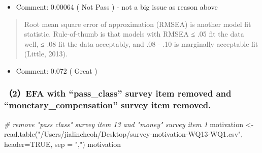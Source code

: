 \documentclass[
]{article}
\newenvironment{Shaded}{\begin{snugshade}}{\end{snugshade}}
\newcommand{\AttributeTok}[1]{\textcolor[rgb]{0.77,0.63,0.00}{#1}}
\newcommand{\CommentTok}[1]{\textcolor[rgb]{0.56,0.35,0.01}{\textit{#1}}}
\newcommand{\ConstantTok}[1]{\textcolor[rgb]{0.00,0.00,0.00}{#1}}
\newcommand{\FunctionTok}[1]{\textcolor[rgb]{0.00,0.00,0.00}{#1}}
\newcommand{\NormalTok}[1]{#1}
\newcommand{\OtherTok}[1]{\textcolor[rgb]{0.56,0.35,0.01}{#1}}
\newcommand{\StringTok}[1]{\textcolor[rgb]{0.31,0.60,0.02}{#1}}
\providecommand{\tightlist}{%
  \setlength{\itemsep}{0pt}\setlength{\parskip}{0pt}}
\begin{document}
\begin{itemize}
\tightlist
\item
  Comment: 0.00064 ( Not Pass ) - not a big issue as reason above
\end{itemize}

\begin{quote}
Root mean square error of approximation (RMSEA) is another model fit
statistic. Rule-of-thumb is that models with RMSEA ≤ .05 fit the data
well, ≤ .08 fit the data acceptably, and .08 - .10 is marginally
acceptable fit (Little, 2013).
\end{quote}

\begin{itemize}
\tightlist
\item
  Comment: 0.072 ( Great )
\end{itemize}

\hypertarget{efa-with-pass_class-survey-item-removed-and-monetary_compensation-survey-item-removed.}{%
\subsubsection{（2）EFA with ``pass\_class'' survey item removed and
``monetary\_compensation'' survey item
removed.}\label{efa-with-pass_class-survey-item-removed-and-monetary_compensation-survey-item-removed.}}

\begin{Shaded}
\begin{Highlighting}[]
\CommentTok{\# remove "pass class" survey item 13 and "money" survey item 1}
\NormalTok{motivation }\OtherTok{\textless{}{-}} \FunctionTok{read.table}\NormalTok{(}\StringTok{"/Users/jialincheoh/Desktop/survey{-}motivation{-}WQ13{-}WQ1.csv"}\NormalTok{, }\AttributeTok{header=}\ConstantTok{TRUE}\NormalTok{, }\AttributeTok{sep =} \StringTok{","}\NormalTok{)}
\NormalTok{motivation}
\end{Highlighting}
\end{Shaded}
\end{document}
